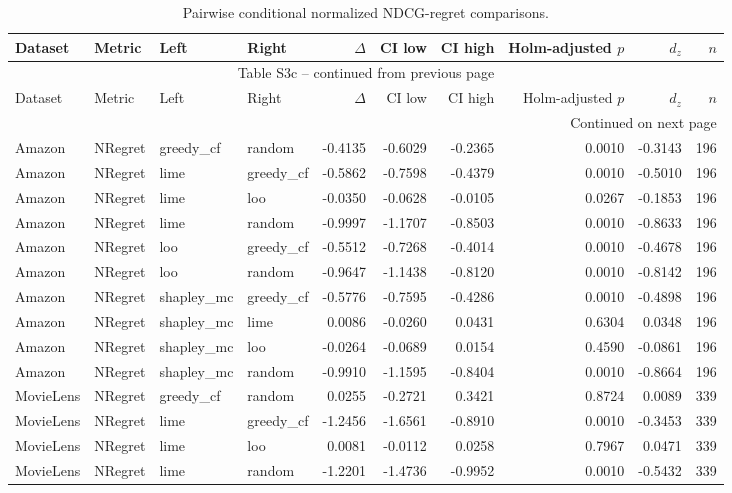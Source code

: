 \begin{longtable}{@{}p{.12\linewidth}p{.18\linewidth}p{.13\linewidth}p{.13\linewidth}rrrrrr@{}}
\caption{Pairwise conditional normalized NDCG-regret comparisons.}\label{tab:S3c}\\
\toprule
Dataset & Metric & Left & Right & $\Delta$ & CI low & CI high & Holm-adjusted $p$ & $d_z$ & $n$ \\
\midrule
\endfirsthead
\multicolumn{10}{c}{Table S3c -- continued from previous page}\\
\toprule
Dataset & Metric & Left & Right & $\Delta$ & CI low & CI high & Holm-adjusted $p$ & $d_z$ & $n$ \\
\midrule
\endhead
\midrule
\multicolumn{10}{r}{Continued on next page}\\
\endfoot
\bottomrule
\endlastfoot
Amazon & NRegret & greedy\_cf & random & -0.4135 & -0.6029 & -0.2365 & 0.0010 & -0.3143 & 196 \\
Amazon & NRegret & lime & greedy\_cf & -0.5862 & -0.7598 & -0.4379 & 0.0010 & -0.5010 & 196 \\
Amazon & NRegret & lime & loo & -0.0350 & -0.0628 & -0.0105 & 0.0267 & -0.1853 & 196 \\
Amazon & NRegret & lime & random & -0.9997 & -1.1707 & -0.8503 & 0.0010 & -0.8633 & 196 \\
Amazon & NRegret & loo & greedy\_cf & -0.5512 & -0.7268 & -0.4014 & 0.0010 & -0.4678 & 196 \\
Amazon & NRegret & loo & random & -0.9647 & -1.1438 & -0.8120 & 0.0010 & -0.8142 & 196 \\
Amazon & NRegret & shapley\_mc & greedy\_cf & -0.5776 & -0.7595 & -0.4286 & 0.0010 & -0.4898 & 196 \\
Amazon & NRegret & shapley\_mc & lime & 0.0086 & -0.0260 & 0.0431 & 0.6304 & 0.0348 & 196 \\
Amazon & NRegret & shapley\_mc & loo & -0.0264 & -0.0689 & 0.0154 & 0.4590 & -0.0861 & 196 \\
Amazon & NRegret & shapley\_mc & random & -0.9910 & -1.1595 & -0.8404 & 0.0010 & -0.8664 & 196 \\
MovieLens & NRegret & greedy\_cf & random & 0.0255 & -0.2721 & 0.3421 & 0.8724 & 0.0089 & 339 \\
MovieLens & NRegret & lime & greedy\_cf & -1.2456 & -1.6561 & -0.8910 & 0.0010 & -0.3453 & 339 \\
MovieLens & NRegret & lime & loo & 0.0081 & -0.0112 & 0.0258 & 0.7967 & 0.0471 & 339 \\
MovieLens & NRegret & lime & random & -1.2201 & -1.4736 & -0.9952 & 0.0010 & -0.5432 & 339 \\

\end{longtable}
